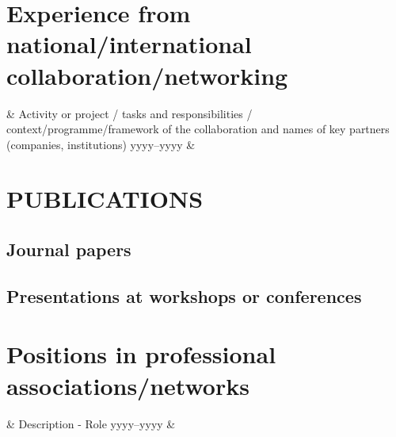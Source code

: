 \documentclass[printversion]{nfrcv}
\begin{document}
\section{Experience from national/international collaboration/networking}
\begin{nfrtable}
           & Activity or project / tasks and responsibilities / context/programme/framework of the collaboration and names of key partners (companies, institutions) \nfrbreak
yyyy--yyyy & \nfrbreak
\end{nfrtable}


\section{PUBLICATIONS} %
\subsection{Journal papers}

\subsection{Presentations at workshops or conferences}

\section{Positions in professional associations/networks} %
\begin{nfrtable}
	       & Description - Role\nfrbreak
yyyy--yyyy & \nfrbreak
\end{nfrtable}
\end{document}
